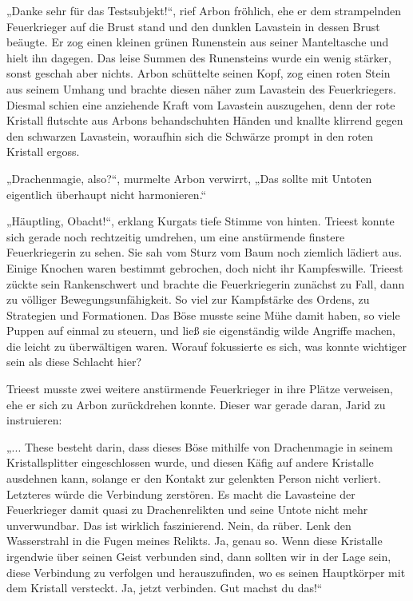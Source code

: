 „Danke sehr für das Testsubjekt!“, rief Arbon fröhlich, ehe er dem strampelnden Feuerkrieger auf die Brust stand und den dunklen Lavastein in dessen Brust beäugte. Er zog einen kleinen grünen Runenstein aus seiner Manteltasche und hielt ihn dagegen. Das leise Summen des Runensteins wurde ein wenig stärker, sonst geschah aber nichts. Arbon schüttelte seinen Kopf, zog einen roten Stein aus seinem Umhang und brachte diesen näher zum Lavastein des Feuerkriegers. Diesmal schien eine anziehende Kraft vom Lavastein auszugehen, denn der rote Kristall flutschte aus Arbons behandschuhten Händen und knallte klirrend gegen den schwarzen Lavastein, woraufhin sich die Schwärze prompt in den roten Kristall ergoss.

„Drachenmagie, also?“, murmelte Arbon verwirrt, „Das sollte mit Untoten eigentlich überhaupt nicht harmonieren.“

„Häuptling, Obacht!“, erklang Kurgats tiefe Stimme von hinten. Trieest konnte sich gerade noch rechtzeitig umdrehen, um eine anstürmende finstere Feuerkriegerin zu sehen. Sie sah vom Sturz vom Baum noch ziemlich lädiert aus. Einige Knochen waren bestimmt gebrochen, doch nicht ihr Kampfeswille. Trieest zückte sein Rankenschwert und brachte die Feuerkriegerin zunächst zu Fall, dann zu völliger Bewegungsunfähigkeit. So viel zur Kampfstärke des Ordens, zu Strategien und Formationen. Das Böse musste seine Mühe damit haben, so viele Puppen auf einmal zu steuern, und ließ sie eigenständig wilde Angriffe machen, die leicht zu überwältigen waren. Worauf fokussierte es sich, was konnte wichtiger sein als diese Schlacht hier?

Trieest musste zwei weitere anstürmende Feuerkrieger in ihre Plätze verweisen, ehe er sich zu Arbon zurückdrehen konnte. Dieser war gerade daran, Jarid zu instruieren:

„... These besteht darin, dass dieses Böse mithilfe von Drachenmagie in seinem Kristallsplitter eingeschlossen wurde, und diesen Käfig auf andere Kristalle ausdehnen kann, solange er den Kontakt zur gelenkten Person nicht verliert. Letzteres würde die Verbindung zerstören. Es macht die Lavasteine der Feuerkrieger damit quasi zu Drachenrelikten und seine Untote nicht mehr unverwundbar. Das ist wirklich faszinierend. Nein, da rüber. Lenk den Wasserstrahl in die Fugen meines Relikts. Ja, genau so. Wenn diese Kristalle irgendwie über seinen Geist verbunden sind, dann sollten wir in der Lage sein, diese Verbindung zu verfolgen und herauszufinden, wo es seinen Hauptkörper mit dem Kristall versteckt. Ja, jetzt verbinden. Gut machst du das!“

